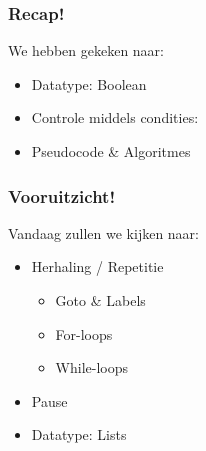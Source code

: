 
\begin{frame}
\frametitle{Recap!}


We hebben gekeken naar:
\begin{itemize}
	\item<2-> Datatype: Boolean
	\item<3-> Controle middels condities: 
	\item<4-> Pseudocode \& Algoritmes
\end{itemize}
\end{frame}

\begin{frame}
\frametitle{Vooruitzicht!}

Vandaag zullen we kijken naar:
\begin{itemize}
	\item<2-> Herhaling / Repetitie
		\begin{itemize}
		  \item<3-> Goto \& Labels
		  \item<4-> For-loops
		  \item<5-> While-loops
		\end{itemize}
	\item<6-> Pause
	\item<7-> Datatype: Lists
\end{itemize}

\end{frame}


